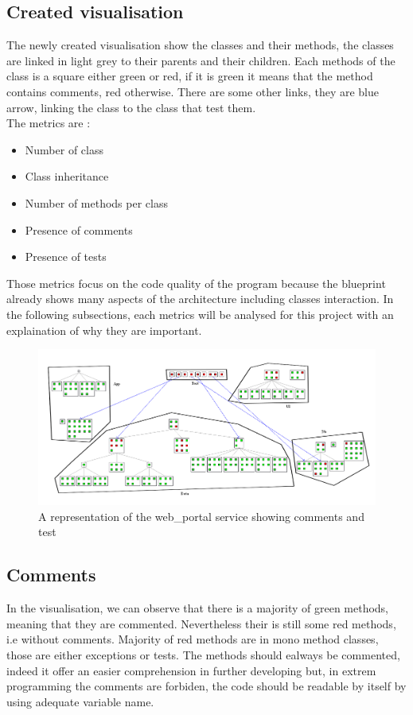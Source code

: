 \documentclass[a4paper,10pt]{article}
\begin{document}
\subsection{Created visualisation}
The newly created visualisation show the classes and their methods, the classes are linked in light grey to their parents and their children. Each methods of the class is a square either green or red, if it is green it means that the method contains comments, red otherwise. There are some other links, they are blue arrow, linking the class to the class that test them.\\
The metrics are :
\begin{itemize}
\item Number of class
\item Class inheritance
\item Number of methods per class
\item Presence of comments
\item Presence of tests
\end{itemize}

Those metrics focus on the code quality of the program because the blueprint already shows many aspects of the architecture including classes interaction. In the following subsections, each metrics will be analysed for this project with an explaination of why they are important.
\begin{figure}[h]
\includegraphics[width=\textwidth]{src/tc2.png}
\caption{A representation of the web\_portal service showing comments and test}
\end{figure}
\subsection{Comments}
In the visualisation, we can observe that there is a majority of green methods, meaning that they are commented. Nevertheless their is still some red methods, i.e without comments. Majority of red methods are in mono method classes, those are either exceptions or tests. The methods should ealways be commented, indeed it offer an easier comprehension in further developing but, in extrem programming the comments are forbiden, the code should be readable by itself by using adequate variable name.
\end{document}
